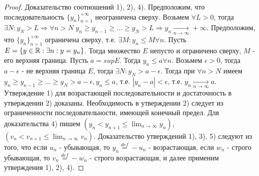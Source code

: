 \documentclass[main]{subfiles}
\begin{document}
\begin{proof}
    Доказательство соотношений 1), 2), 4). Предположим, что последовательность
    $\{y_n\}_{n=1}^{+\infty}$ неограничена сверху. Возьмем $\forall L > 0$,
    тогда $\exists N : y_N > L \Rightarrow \forall n > N \; 
    y_n \geq y_{n-1} \geq \ldots \geq y_N > L \Rightarrow y_n 
    \underset{n\to\infty}{\to} +\infty$.
    Предположим, что $\{y_n\}_{n=1}^{+\infty}$ ограничена сверху, т.е. 
    $\exists M : y_n \leq M \forall n$. Пусть $E = \{y \in \mathbb{R} : \exists n :
    y = y_n\}$. Тогда множество $E$ непусто и ограничено сверху, $M$ - его
    верхняя граница. Пусть $a = supE$. Тогда $y_n \leq a \forall n$. Возьмем
    $\epsilon > 0$, тогда $a - \epsilon$ - не верхняя граница $E$, тогда
    $\exists N : y_N > a - \epsilon$. Тогда при $\forall n > N$ имеем
    $y_n \geq y_{n-1} \geq \ldots \geq y_N > a - \epsilon, y_n \leq a$, т.е. 
    $|y_n - a| < \epsilon$, т.е. $y_n \underset{n\to\infty}{\to} a$. 
    Утверждение 1) для возрастающей последовательности и достаточность в
    утверждении 2) доказаны. Необходимость в утверждении 2) следует из 
    ограниченности последовательности, имеющей конечный предел.
    Для доказательства 4) пишем $(y_n < y_{n+1} \leq \lim_{n\to\infty}y_n)$,
    $(v_n < v_{n+1} \leq \lim_{n\to\infty}v_n)$.
    Доказательство утверждений 1), 3), 5) следуют из того, что если $u_n$ - 
    убывающая, то $y_n \overset{def}{=} -u_n$ - возрастающая, если $w_n$ - 
    строго убывающая, то $v_n \overset{def}{=} -w_n$ - строго возрастающая, и 
    далее применим утверждения 1), 2), 4).
\end{proof}
\end{document}
